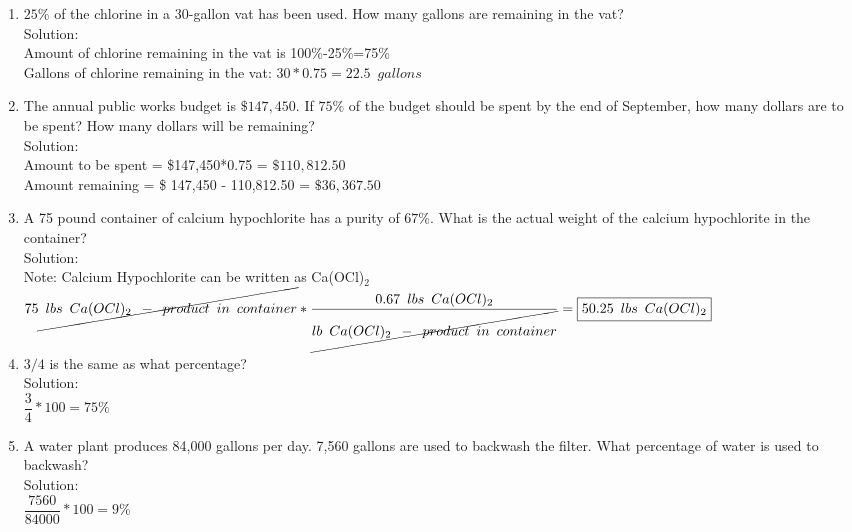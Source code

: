 \begin{enumerate}
\item $25 \%$ of the chlorine in a 30-gallon vat has been used. How many gallons are remaining in the vat?\\
Solution:\\
Amount of chlorine remaining in the vat is 100\%-25\%=75\%\\

Gallons of chlorine remaining in the vat: $30*0.75=\boxed{22.5 \enspace gallons}$


\item The annual public works budget is $\$ 147,450$. If $75 \%$ of the budget should be spent by the end of September, how many dollars are to be spent? How many dollars will be remaining?\\
\vspace{0.2cm}
Solution:\\
Amount to be spent = \$147,450*0.75 = $\boxed{\$110,812.50}$\\
\vspace{0.2cm}
Amount remaining = \$ 147,450 - 110,812.50 = $\boxed{\$36,367.50}$

\item A 75 pound container of calcium hypochlorite has a purity of $67 \%$. What is the actual weight of the calcium hypochlorite in the container? \\
\vspace{0.2cm}
Solution:\\
Note: Calcium Hypochlorite can be written as Ca(OCl)$_2$\\
$75 \cancel{\enspace lbs \enspace Ca(OCl)_2 \enspace - \enspace product \enspace in \enspace container}*\dfrac{0.67 \enspace lbs \enspace Ca(OCl)_2 }{\cancel{lb \enspace Ca(OCl)_2  \enspace - \enspace product \enspace in \enspace container}} = \boxed{50.25 \enspace lbs \enspace Ca(OCl)_2}$\\
\vspace{0.2cm}


\item $3 / 4$ is the same as what percentage?\\
\vspace{0.2cm}
Solution:\\
$\dfrac{3}{4}*100 = \boxed{75\%}$\\
\vspace{0.2cm}

\item A water plant produces 84,000 gallons per day. 7,560 gallons are used to backwash the filter. What percentage of water is used to backwash?\\
\vspace{0.2cm}
Solution:\\
$\dfrac{7560}{84000}*100 = \boxed{9\%}$\\
\vspace{0.2cm}


\end{enumerate}

